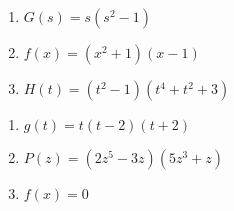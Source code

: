 \documentclass{ximera}
\begin{document}
\begin{multicols}{3}
\begin{enumerate}
\setcounter{enumi}{\value{HW}}

\item $G(s) = s(s^2 - 1)$
\item $f(x) = (x^2+1)(x-1)$
\item $H(t) = (t^2-1)(t^4+t^2+3)$

\setcounter{HW}{\value{enumi}}
\end{enumerate}
\end{multicols}

\begin{multicols}{3}
\begin{enumerate}
\setcounter{enumi}{\value{HW}}

\item $g(t) = t(t-2)(t+2)$
\item $P(z) = (2z^{5} - 3z)(5z^3+z)$ 
\item $f(x) =0$  \label{evenoddornotpolylast}

\setcounter{HW}{\value{enumi}}
\end{enumerate}
\end{multicols}
\end{document}
